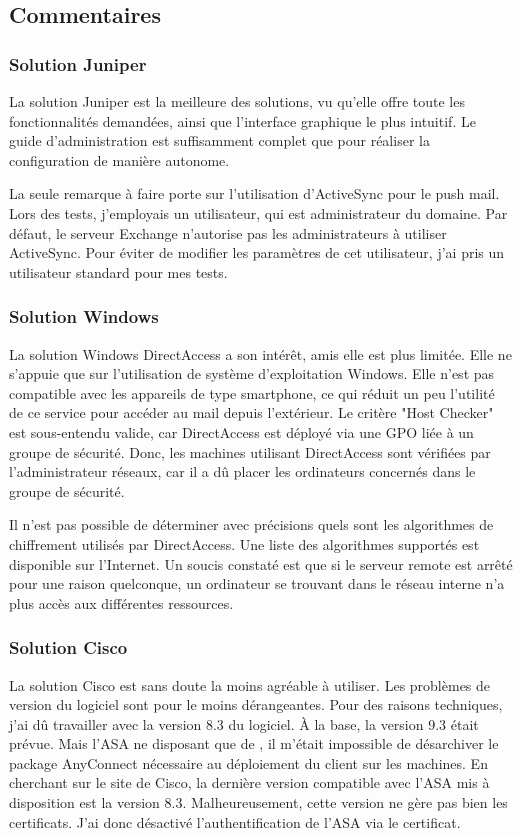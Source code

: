 \subsection{Commentaires}
\subsubsection{Solution Juniper}
La solution Juniper est la meilleure des solutions, vu qu'elle offre toute les fonctionnalités demandées, ainsi que l'interface graphique le plus intuitif. 
Le guide d'administration est suffisamment complet que pour réaliser la configuration de manière autonome.

La seule remarque à faire porte sur l'utilisation d'ActiveSync pour le push mail.
Lors des tests, j'employais un utilisateur, qui est administrateur du domaine.
Par défaut, le serveur Exchange n'autorise pas les administrateurs à utiliser ActiveSync.
Pour éviter de modifier les paramètres de cet utilisateur, j'ai pris un utilisateur standard pour mes tests.

\subsubsection{Solution Windows}
La solution Windows DirectAccess a son intérêt, amis elle est plus limitée.
Elle ne s'appuie que sur l'utilisation de système d'exploitation Windows.
Elle n'est pas compatible avec les appareils de type smartphone, ce qui réduit un peu l'utilité de ce service pour accéder au mail depuis l'extérieur.
Le critère "Host Checker" est sous-entendu valide, car DirectAccess est déployé via une GPO liée à un groupe de sécurité.
Donc, les machines utilisant DirectAccess sont vérifiées par l'administrateur réseaux, car il a dû placer les ordinateurs concernés dans le groupe de sécurité.

Il n'est pas possible de déterminer avec précisions quels sont les algorithmes de chiffrement utilisés par DirectAccess.
Une liste des algorithmes supportés est disponible sur l'Internet.
Un soucis constaté est que si le serveur remote est arrêté pour une raison quelconque, un ordinateur se trouvant dans le réseau interne n'a plus accès aux différentes ressources.

\subsubsection{Solution Cisco}
La solution Cisco est sans doute la moins agréable à utiliser.
Les problèmes de version du logiciel sont pour le moins dérangeantes.
Pour des raisons techniques, j'ai dû travailler avec la version 8.3 du logiciel.
À la base, la version 9.3 était prévue.
Mais l'ASA ne disposant que de , il m'était impossible de désarchiver le package AnyConnect nécessaire au déploiement du client sur les machines.
En cherchant sur le site de Cisco, la dernière version compatible avec l'ASA mis à disposition est la version 8.3.
Malheureusement, cette version ne gère pas bien les certificats.
J'ai donc désactivé l'authentification de l'ASA via le certificat.

